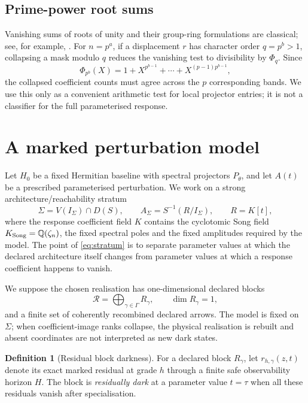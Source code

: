 \documentclass[11pt]{article}
\theoremstyle{definition}
\newtheorem{definition}[proposition]{Definition}
\theoremstyle{remark}
\newcommand{\R}{\mathcal R}
\begin{document}
\subsection{Prime-power root sums}

Vanishing sums of roots of unity and their group-ring formulations are classical; see, for example, \textcite{LamLeung2000}. For $n=p^a$, if a displacement $r$ has character order $q=p^b>1$, collapsing a mask modulo $q$ reduces the vanishing test to divisibility by $\Phi_q$. Since
\[
\Phi_{p^b}(X)=1+X^{p^{b-1}}+\cdots+X^{(p-1)p^{b-1}},
\]
the collapsed coefficient counts must agree across the $p$ corresponding bands. We use this only as a convenient arithmetic test for local projector entries; it is not a classifier for the full parameterised response.

\section{A marked perturbation model}\label{sec:model}

Let $H_0$ be a fixed Hermitian baseline with spectral projectors $P_\theta$, and let $A(t)$ be a prescribed parameterised perturbation. We work on a strong architecture/reachability stratum
\begin{equation}\label{eq:stratum}
\Sigma=V(I_\Sigma)\cap D(S),\qquad
A_\Sigma=S^{-1}(R/I_\Sigma),\qquad R=K[t],
\end{equation}
where the response coefficient field $K$ contains the cyclotomic Song field $K_{\rm Song}=\mathbb Q(\zeta_n)$, the fixed spectral poles and the fixed amplitudes required by the model. The point of \eqref{eq:stratum} is to separate parameter values at which the declared architecture itself changes from parameter values at which a response coefficient happens to vanish.

We suppose the chosen realisation has one-dimensional declared blocks
\[
\R=\bigoplus_{\gamma\in\Gamma}R_\gamma,
\qquad \dim R_\gamma=1,
\]
and a finite set of coherently recombined declared arrows. The model is fixed on $\Sigma$; when coefficient-image ranks collapse, the physical realisation is rebuilt and absent coordinates are not interpreted as new dark states.

\begin{definition}[Residual block darkness]
For a declared block $R_\gamma$, let $r_{h,\gamma}(z,t)$ denote its exact marked residual at grade $h$ through a finite safe observability horizon $H$. The block is \emph{residually dark} at a parameter value $t=\tau$ when all these residuals vanish after specialisation.
\end{definition}
\end{document}
